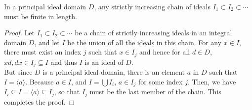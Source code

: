 \begin{lemma}
	In a principal ideal domain $D$, any strictly increasing chain of ideals $I_1\subset I_2\subset\cdots$ must be finite in length.
\end{lemma}
\begin{proof}
	Let $I_1\subset I_2\subset\cdots$ be a chain of strictly increasing ideals in an integral domain $D$, and let $I$ be the union of all the ideals in this chain. For any $x\in I$, there must exist an index $j$ such that $x\in I_j$ and hence for all $d\in D$, $xd,dx\in I_j\subseteq I$ and thus $I$ is an ideal of $D$.\\
	But since $D$ is a principal ideal domain, there is an element $a$ in $D$ such that $I=\langle a\rangle$. Because $a\in I$, and $I=\bigcup I_i$, $a\in I_j$ for some index $j$. Then, we have $I_i\subseteq I=\langle a\rangle\subseteq I_j$, so that $I_j$ must be the last member of the chain. This completes the proof.
\end{proof}

